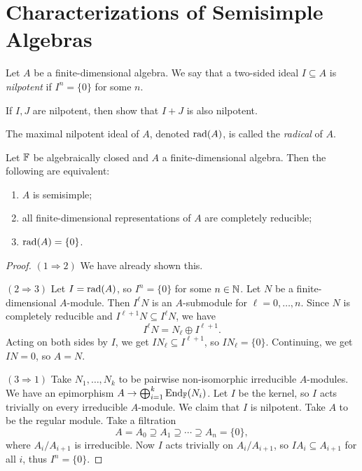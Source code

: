 \section{Characterizations of Semisimple Algebras}
\begin{definition}
  Let $A$ be a finite-dimensional
  algebra. We say that a two-sided
  ideal $I \subseteq A$ is
  \emph{nilpotent} if $I^n = \{0\}$
  for some $n$.
\end{definition}

\begin{exercise}
  If $I, J$ are nilpotent, then
  show that $I + J$ is also nilpotent.
\end{exercise}

\begin{definition}
  The maximal nilpotent ideal of $A$,
  denoted $\operatorname{rad}(A)$, is
  called the \emph{radical} of $A$.
\end{definition}

\begin{theorem}
  Let $\mathbb{F}$ be algebraically closed and
  $A$ a finite-dimensional algebra.
  Then the following are equivalent:
  \begin{enumerate}
    \item $A$ is semisimple;
    \item all finite-dimensional
      representations of $A$ are completely
      reducible;
    \item $\operatorname{rad}(A) = \{0\}$.
  \end{enumerate}
\end{theorem}

\begin{proof}
  $(1 \Rightarrow 2)$ We have already
  shown this.

  $(2 \Rightarrow 3)$ Let $I = \operatorname{rad}(A)$,
  so $I^n = \{0\}$ for some $n \in \mathbb{N}$.
  Let $N$ be a finite-dimensional
  $A$-module. Then
  $I^\ell N$ is an $A$-submodule
  for $\ell = 0, \dots, n$. Since
  $N$ is completely reducible
  and $I^{\ell + 1}N \subseteq I^{\ell} N$, we have
  \[
    I^\ell N = N_\ell \oplus I^{\ell + 1}.
  \]
  Acting on both sides by $I$, we get
  $I N_{\ell} \subseteq I^{\ell + 1}$,
  so $IN_{\ell} = \{0\}$.
  Continuing, we get $IN = 0$, so
  $A = N$.

  $(3 \Rightarrow 1)$ Take $N_1, \dots, N_k$
  to be
  pairwise non-isomorphic irreducible
  $A$-modules. We have an
  epimorphism $A \to \bigoplus_{i = 1}^k \operatorname{End}_{\mathbb{F}}(N_i)$.
  Let $I$ be the kernel, so
  $I$ acts trivially on every
  irreducible $A$-module. We claim that
  $I$ is nilpotent.
  Take $A$ to be the regular module.
  Take a filtration
  \[
    A = A_0 \supseteq A_1 \supseteq \cdots
    \supseteq A_n = \{0\},
  \]
  where
  $A_i / A_{i + 1}$ is irreducible.
  Now $I$ acts trivially
  on $A_i / A_{i + 1}$, so
  $I A_i \subseteq A_{i + 1}$ for all
  $i$, thus $I^n = \{0\}$.
\end{proof}

